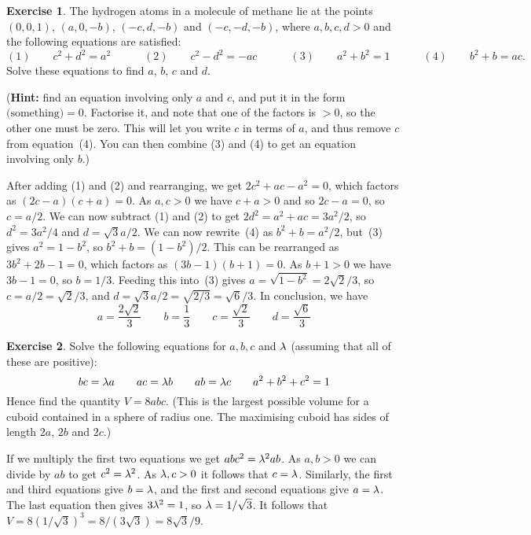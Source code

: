 \documentclass[a4paper]{amsart}
\theoremstyle{definition}
\newtheorem{exercise}{Exercise}[section]
\newenvironment{solution}{{\noindent \bf Solution:}}{}
\begin{document}
\begin{exercise}\label{ex-tetra-solve}
The hydrogen atoms in a molecule of methane lie at the
 points $(0,0,1)$, $(a,0,-b)$, $(-c,d,-b)$ and $(-c,-d,-b)$,
 where $a,b,c,d>0$ and the following equations are
 satisfied:
 \[
  (1)\qquad c^2+d^2 = a^2 \hspace{3em}
  (2)\qquad c^2-d^2 = -ac \hspace{3em}
  (3)\qquad a^2+b^2 = 1   \hspace{3em}
  (4)\qquad b^2+b   = ac. 
 \]
 Solve these equations to find $a$, $b$, $c$ and $d$.
 
 (\textbf{Hint:} find an equation involving only $a$ and
 $c$, and put it in the form $\text{(something)}=0$.
 Factorise it, and note that one of the factors is $>0$, so
 the other one must be zero.  This will let you write $c$ in
 terms of $a$, and thus remove $c$ from equation~(4).  You
 can then combine (3) and (4) to get an equation involving
 only $b$.)
\end{exercise}
\begin{solution}
After adding (1) and (2) and rearranging, we get
 $2c^2+ac-a^2=0$, which factors as $(2c-a)(c+a)=0$.  As
 $a,c>0$ we have $c+a>0$ and so $2c-a=0$, so $c=a/2$.  We
 can now subtract (1) and (2) to get $2d^2=a^2+ac=3a^2/2$,
 so $d^2=3a^2/4$ and $d=\sqrt{3}a/2$.  We can now
 rewrite~(4) as $b^2+b=a^2/2$, but~(3) gives $a^2=1-b^2$, so
 $b^2+b=(1-b^2)/2$.  This can be rearranged as
 $3b^2+2b-1=0$, which factors as $(3b-1)(b+1)=0$.  As
 $b+1>0$ we have $3b-1=0$, so $b=1/3$.  Feeding this
 into~(3) gives $a=\sqrt{1-b^2}=2\sqrt{2}/3$, so
 $c=a/2=\sqrt{2}/3$, and
 $d=\sqrt{3}a/2=\sqrt{2/3}=\sqrt{6}/3$.  In conclusion, we
 have
 \[ a = \frac{2\sqrt{2}}{3}  \hspace{2em}
    b = \frac{1}{3}          \hspace{2em}
    c = \frac{\sqrt{2}}{3}   \hspace{2em}
    d = \frac{\sqrt{6}}{3}
 \]
\end{solution}
\begin{exercise}\label{ex-cuboid}
Solve the following equations for $a,b,c$ and $\lambda$
 (assuming that all of these are positive):
 \[ bc=\lambda a \hspace{2em}
    ac=\lambda b \hspace{2em}
    ab=\lambda c \hspace{2em}
    a^2+b^2+c^2 = 1 
 \]
 Hence find the quantity $V=8abc$.  (This is the largest
 possible volume for a cuboid contained in a sphere of
 radius one.  The maximising cuboid has sides of length
 $2a$, $2b$ and $2c$.)
\end{exercise}
\begin{solution}
If we multiply the first two equations we get
 $abc^2=\lambda^2ab$.  As $a,b>0$ we can divide by $ab$ to get
 $c^2=\lambda^2$.  As $\lambda,c>0$ it follows that $c=\lambda$.
 Similarly, the first and third equations give $b=\lambda$, and
 the first and second equations give $a=\lambda$.  The last
 equation then gives $3\lambda^2=1$, so $\lambda=1/\sqrt{3}$.  It
 follows that
 $V=8(1/\sqrt{3})^3=8/(3\sqrt{3})=8\sqrt{3}/9$.
\end{solution}
\end{document}
